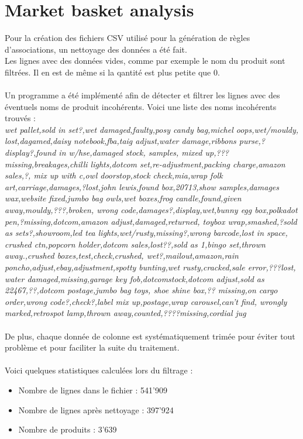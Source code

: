 \documentclass[a4paper]{article}
\begin{document}
\section{Market basket analysis}

Pour la création des fichiers CSV utilisé pour la génération de règles d'associations, un nettoyage des données a été fait.
\\
Les lignes avec des données vides, comme par exemple le nom du produit sont filtrées.
Il en est de même si la qantité est plus petite que 0.
\\\\
Un programme a été implémenté afin de détecter et filtrer les lignes avec des éventuels noms de produit incohérents.
Voici une liste des noms incohérents trouvés :
\\
\textit{wet pallet,sold in set?,wet damaged,faulty,posy candy bag,michel oops,wet/mouldy,
lost,dagamed,daisy notebook,fba,taig adjust,water damage,ribbons purse,?display?,found in w/hse,damaged stock,
samples,
mixed up,???missing,breakages,chilli lights,dotcom set,re-adjustment,packing charge,amazon sales,?,
mix up with c,owl doorstop,stock check,mia,wrap folk art,carriage,damages,?lost,john lewis,found box,20713,show samples,damages wax,website fixed,jumbo bag owls,wet boxes,frog candle,found,given away,mouldy,???,broken,
wrong code,damages?,display,wet,bunny egg box,polkadot pen,?missing,dotcom,amazon adjust,damaged,returned,
toybox  wrap,smashed,?sold as sets?,showroom,led tea lights,wet/rusty,missing?,wrong barcode,lost in space,
crushed ctn,popcorn holder,dotcom sales,lost??,sold as 1,bingo set,thrown away.,crushed boxes,test,check,crushed,
wet?,mailout,amazon,rain poncho,adjust,ebay,adjustment,spotty bunting,wet rusty,cracked,sale error,???lost,
water damaged,missing,garage key fob,dotcomstock,dotcom adjust,sold as 22467,??,dotcom postage,jumbo bag toys,
shoe shine box,?? missing,on cargo order,wrong code?,check?,label mix up,postage,wrap carousel,can't find,
wrongly marked,retrospot lamp,thrown away,counted,????missing,cordial jug}
\\\\
De plus, chaque donnée de colonne est systématiquement trimée pour éviter tout problème et pour faciliter la suite du traitement. 
\\\\
Voici quelques statistiques calculées lors du filtrage :
\begin{itemize}
	\item Nombre de lignes dans le fichier : 541'909
	\item Nombre de lignes après nettoyage : 397'924
	\item Nombre de produits : 3'639
\end{itemize}
\vspace{6pt}
\end{document}
